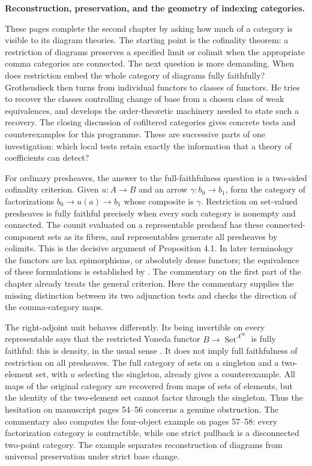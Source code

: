 \begingroup
{}
\noindent\textbf{Reconstruction, preservation, and the geometry of indexing categories.}

These pages complete the second chapter by asking how much of a category is
visible to its diagram theories. The starting point is the cofinality theorem:
a restriction of diagrams preserves a specified limit or colimit when the
appropriate comma categories are connected. The next question is more demanding.
When does restriction embed the whole category of diagrams fully faithfully?
Grothendieck then turns from individual functors to classes of functors. He
tries to recover the classes controlling change of base from a chosen class
of weak equivalences, and develops the order-theoretic machinery needed to
state such a recovery. The closing discussion of cofiltered categories gives
concrete tests and counterexamples for this programme. These are successive
parts of one investigation: which local tests retain exactly the information
that a theory of coefficients can detect?

For ordinary presheaves, the answer to the full-faithfulness question is a
two-sided cofinality criterion. Given $u:A\to B$ and an arrow
$\gamma:b_0\to b_1$, form the category of factorizations
$b_0\to u(a)\to b_1$ whose composite is $\gamma$. Restriction on
set-valued presheaves is fully faithful precisely when every such category
is nonempty and connected. The counit evaluated on a representable presheaf
has these connected-component sets as its fibres, and representables generate
all presheaves by colimits. This is the decisive argument of Proposition 4.1.
In later terminology the functors are lax epimorphisms, or absolutely dense
functors; the equivalence of these formulations is established by
\citet{AdamekElBashirSobralVelebil2001}. The commentary on the first part of the
chapter already treats the general criterion. Here the commentary supplies the
missing distinction between its two adjunction tests and checks the direction
of the comma-category maps.

The right-adjoint unit behaves differently. Its being invertible on every
representable says that the restricted Yoneda functor
$B\to\operatorname{Set}^{A^{\mathrm{op}}}$ is fully faithful: this is
density, in the usual sense \citep[Definition 6.5.11]{Riehl2016}. It does not
imply full faithfulness of restriction on all presheaves. The full category
of sets on a singleton and a two-element set, with $u$ selecting the
singleton, already gives a counterexample. All maps of the original category
are recovered from maps of sets of elements, but the identity of the
two-element set cannot factor through the singleton. Thus the hesitation on
manuscript pages 54--56 concerns a genuine obstruction. The commentary also
computes the four-object example on pages 57--58: every factorization
category is contractible, while one strict pullback is a disconnected
two-point category. The example separates reconstruction of diagrams from
universal preservation under strict base change.

